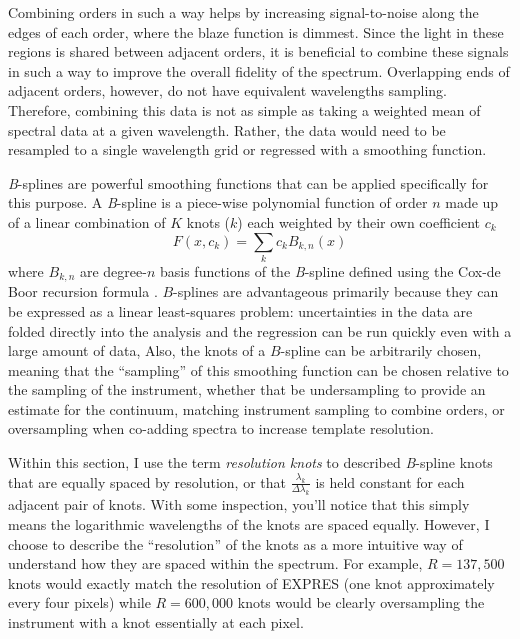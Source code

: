 Combining orders in such a way helps by increasing signal-to-noise along the edges of each order, where the blaze function is dimmest. Since the light in these regions is shared between adjacent orders, it is beneficial to combine these signals in such a way to improve the overall fidelity of the spectrum. Overlapping ends of adjacent orders, however, do not have equivalent wavelengths sampling. Therefore, combining this data is not as simple as taking a weighted mean of spectral data at a given wavelength. Rather, the data would need to be resampled to a single wavelength grid \citep{anglada-escude_harps-terra_2012} or regressed with a smoothing function.

\textit{B}-splines \citep{de_boor_practical_1978, dierckx_curve_1995, eilers_flexible_1996} are powerful smoothing functions that can be applied specifically for this purpose. A \textit{B}-spline is a piece-wise polynomial function of order $n$ made up of a linear combination of $K$ knots ($k$) each weighted by their own coefficient $c_k$
\begin{equation}
    F(x,{c_k}) = \sum_k {c_k B_{k,n}(x)}
\end{equation}
where $B_{k,n}$ are degree-$n$ basis functions of the \textit{B}-spline defined using the Cox-de Boor recursion formula \citep{de_boor_practical_1978}. $B$-splines are advantageous primarily because they can be expressed as a linear least-squares problem: uncertainties in the data are folded directly into the analysis and the regression can be run quickly even with a large amount of data, Also, the knots of a $B$-spline can be arbitrarily chosen, meaning that the ``sampling'' of this smoothing function can be chosen relative to the sampling of the instrument, whether that be undersampling to provide an estimate for the continuum, matching instrument sampling to combine orders, or oversampling when co-adding spectra to increase template resolution.

Within this section, I use the term \textit{resolution knots} to described \textit{B}-spline knots that are equally spaced by resolution, or that $\frac{\lambda_k}{\Delta \lambda_k}$ is held constant for each adjacent pair of knots. With some inspection, you'll notice that this simply means the logarithmic wavelengths of the knots are spaced equally. However, I choose to describe the ``resolution'' of the knots as a more intuitive way of understand how they are spaced within the spectrum. For example, $R=137,500$ knots would exactly match the resolution of EXPRES (one knot approximately every four pixels) while $R=600,000$ knots would be clearly oversampling the instrument with a knot essentially at each pixel.

